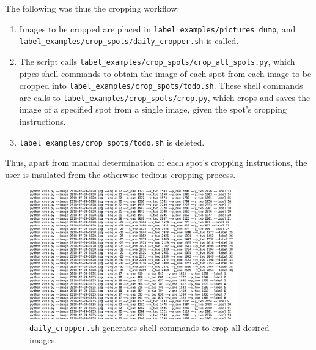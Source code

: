 \documentclass[a4paper, 11pt]{article} %
\begin{document}
		\hspace*{-6mm}The following was thus the cropping workflow:
		\begin{enumerate}
			\item Images to be cropped are placed in 
			\texttt{label\_examples/pictures\_dump}, and
			\texttt{label\_examples/crop\_spots/daily\_cropper.sh} is called.
			\item The script calls \texttt{label\_examples/crop\_spots/crop\_all\_spots.py}, which pipes
			shell commands to obtain the image of each spot from each image to 
			be cropped into
			\texttt{label\_examples/crop\_spots/todo.sh}. These shell commands are calls to
			\texttt{label\_examples/crop\_spots/crop.py}, which crops and saves 
			the image of a specified spot from a
			single image, given the spot's cropping instructions.
			\item \texttt{label\_examples/crop\_spots/todo.sh} is deleted.
		\end{enumerate}
		Thus, apart from manual determination of each spot's cropping 
		instructions, the user is insulated from the otherwise tedious cropping 
		process.
		\begin{figure}[H]
			\centering
			\includegraphics[width=0.8\textwidth]{figures/daily_cropper_example}
			\caption{\texttt{daily\_cropper.sh} generates shell commands to 
			crop all desired images.}
		\end{figure}
\end{document}
